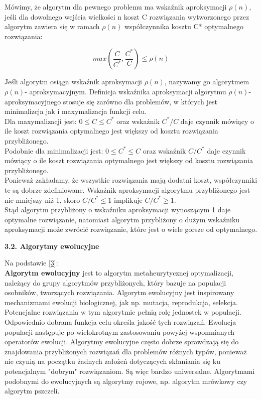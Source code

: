 \documentclass[a4paper, twoside, 12pt, justified]{article}
\begin{document}
	Mówimy, że algorytm dla pewnego problemu ma wskaźnik aproksymacji $\rho(n)$, jeśli dla dowolnego wejścia wielkości n koszt C rozwiązania wytworzonego przez algorytm zawiera się
	w ramach $\rho(n)$ współczynnika kosztu C* optymalnego rozwiązania:
	
	\begin{equation}
		max \left(\frac{C}{C^*}, \frac{C^*}{C}\right) \leq \rho(n) 
	\end{equation}
	
	Jeśli algorytm osiąga wskaźnik aproksymacji $\rho(n)$, nazywamy go algorytmem $\rho(n)$- aproksymacyjnym. Definicja wskaźnika aproksymacji algorytmu $\rho(n)$- aproksymacyjnego stosuje się zarówno dla problemów, w których jest minimalizcja jak i maxymalizacja funkcji celu.\\
	Dla maxymalizacji jest: $0 \le C \leq C^*$ oraz wskaźnik $C^*/C$ daje czynnik mówiący o ile koszt rozwiązania optymalnego jest większy od kosztu rozwiązania przybliżonego.\\
	Podobnie dla minimalizacji jest: $0 \le C^* \leq C$ oraz wskaźnik $C/C^*$ daje czynnik mówiący o ile koszt rozwiązania optymalnego jest większy od kosztu rozwiązania przybliżonego.\\
	Ponieważ zakładamy, że wszystkie rozwiązania mają dodatni koszt, współczynniki te są dobrze zdefiniowane. Wskaźnik aproksymacji algorytmu przybliżonego jest nie mniejszy niż 1, skoro $C/C^* \leq 1$ implikuje $C/C^* \geq 1$.\\
	Stąd algorytm przybliżony o wskaźniku aproksymacji wynoszącym 1 daje optymalne rozwiązanie, natomiast algorytm przybliżony o dużym wskaźniku aproksymacji może zwrócić rozwiązanie, które jest o wiele gorsze od optymalnego.\\
	
	\newpage
	
	\begin{flushleft}
		\begin{large}
			\textbf{3.2. Algorytmy ewolucyjne}
		\end{large}
	\end{flushleft}
	\vspace{5mm} %

	Na podstawie \hyperlink{evolutionaryalgorithm}{[3]}:\\
	\textbf{Algorytm ewolucyjny} jest to algorytm metaheurytycznej optymalizacji, należący do grupy algorytmów przybliżonych, który bazuje na populacji osobników, tworzących rozwiązania. Algorytm ewolucyjny jest inspirowany mechanizmami ewolucji biologicznej, jak np. mutacja, reprodukcja, selekcja. Potencjalne rozwiązania w tym algorytmie pełnią rolę jednostek w populacji. Odpowiednio dobrana funkcja celu określa jakość tych rozwiązań. Ewolucja populacji następuje po wielokrotnym zastosowaniu powyżej wspomnianych operatorów ewolucji. Algorytmy ewolucyjne często dobrze sprawdzają się do znajdowania przybliżonych rozwiązań dla problemów różnych typów, ponieważ nie czynią na początku żadnych założeń dotyczących skłaniania się ku potencjalnym "dobrym" rozwiązaniom. Są więc bardzo uniwersalne. Algorytmami podobnymi do ewolucyjnych są algorytmy rojowe, np. algorytm mrówkowy czy algorytm pszczeli.\\
	
\end{document}
